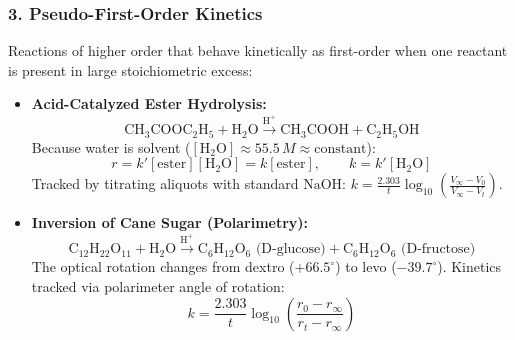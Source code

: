 \documentclass[10pt,a4paper]{article}
\begin{document}
\subsubsection{3. Pseudo-First-Order Kinetics}
Reactions of higher order that behave kinetically as first-order when one reactant is present in large stoichiometric excess:
\begin{itemize}
  \item \textbf{Acid-Catalyzed Ester Hydrolysis:}
  \begin{equation}
    \mathrm{CH_3COOC_2H_5} + \mathrm{H_2O} \xrightarrow{\mathrm{H^+}} \mathrm{CH_3COOH} + \mathrm{C_2H_5OH}
  \end{equation}
  Because water is solvent ($[\mathrm{H_2O}] \approx 55.5\,\si{M} \approx \text{constant}$):
  \begin{equation}
    r = k' [\mathrm{ester}][\mathrm{H_2O}] = k [\mathrm{ester}], \qquad k = k' [\mathrm{H_2O}]
  \end{equation}
  Tracked by titrating aliquots with standard $\mathrm{NaOH}$: $k = \frac{2.303}{t}\log_{10}\left(\frac{V_\infty - V_0}{V_\infty - V_t}\right)$.
  \item \textbf{Inversion of Cane Sugar (Polarimetry):}
  \begin{equation}
    \mathrm{C_{12}H_{22}O_{11}} + \mathrm{H_2O} \xrightarrow{\mathrm{H^+}} \mathrm{C_6H_{12}O_6\text{ (D-glucose)}} + \mathrm{C_6H_{12}O_6\text{ (D-fructose)}}
  \end{equation}
  The optical rotation changes from dextro ($+66.5^\circ$) to levo ($-39.7^\circ$). Kinetics tracked via polarimeter angle of rotation:
  \begin{equation}
    k = \frac{2.303}{t}\log_{10}\left(\frac{r_0 - r_\infty}{r_t - r_\infty}\right)
  \end{equation}
\end{itemize}
\end{document}
